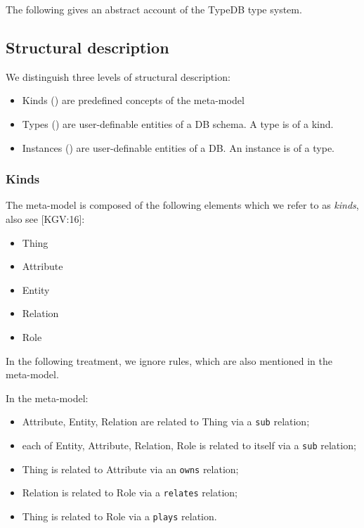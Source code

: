 \documentclass{article}
\begin{document}
The following gives an abstract account of the TypeDB type system.

\subsection{Structural description}

We distinguish three levels of structural description:
\begin{itemize}
\item Kinds () are predefined concepts of the meta-model
\item Types () are user-definable entities of a DB
  schema. A type is of a kind.
\item Instances () are user-definable entities
  of a DB. An instance is of a type.
\end{itemize}

\subsubsection{Kinds}\label{sec:structure_kinds}

The meta-model is composed of the following elements which we refer to as
\emph{kinds}, also see [KGV:16]:
\begin{itemize}
\item Thing
\item Attribute
\item Entity
\item Relation
\item Role
\end{itemize}
In the following treatment, we ignore rules, which are also mentioned in the
meta-model.

In the meta-model:
\begin{itemize}
\item Attribute, Entity, Relation are related to Thing via a \texttt{sub}
  relation;
\item each of Entity, Attribute, Relation, Role is related to itself via a
  \texttt{sub} relation;
\item Thing is related to Attribute via an \texttt{owns} relation;
\item Relation is related to Role via a \texttt{relates} relation;
\item Thing is related to Role via a \texttt{plays} relation.
\end{itemize}
\end{document}
